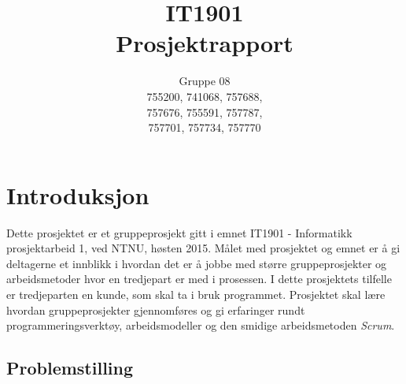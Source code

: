 \documentclass[12pt,a4paper,norsk]{article}
\title{IT1901 \\ Prosjektrapport}
\author{Gruppe 08\\
    755200, 741068, 757688,\\
    757676, 755591, 757787,\\
    757701, 757734, 757770}
\begin{document}
	\maketitle
	\newpage
	\tableofcontents
	\newpage
	\section{Introduksjon}







Dette prosjektet er et gruppeprosjekt gitt i emnet IT1901 - Informatikk prosjektarbeid 1, ved NTNU, høsten 2015. Målet med prosjektet og emnet er å gi deltagerne et innblikk i hvordan det er å jobbe med større gruppeprosjekter og  arbeidsmetoder hvor en tredjepart er med i prosessen. I dette prosjektets tilfelle er tredjeparten en kunde, som skal ta i bruk programmet. Prosjektet skal lære hvordan gruppeprosjekter gjennomføres og gi erfaringer rundt programmeringsverktøy, arbeidsmodeller og den smidige arbeidsmetoden \textit{Scrum}. %

\subsection{Problemstilling}
\end{document}
